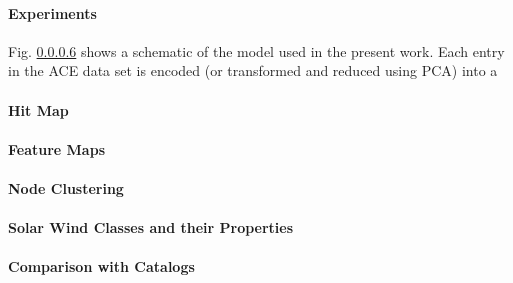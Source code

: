 \paragraph{Experiments}
Fig. \ref{} shows a schematic of the model used in the present work. Each entry in the ACE data set is encoded (or transformed and reduced using PCA) into a 

\paragraph{Hit Map}

\paragraph{Feature Maps}

\paragraph{Node Clustering}

\paragraph{Solar Wind Classes and their Properties}

\paragraph{Comparison with Catalogs}